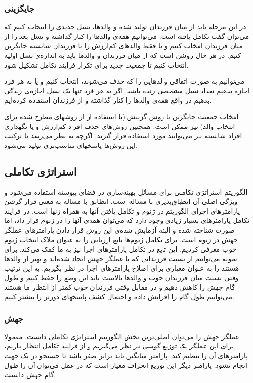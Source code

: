 \documentclass{report}
\begin{document}
\subsubsection{جایگزینی}
در این مرحله باید از میان فرزندان تولید شده و والدها، نسل جدیدی را انتخاب کنیم که می‌توان گفت تکامل یافته است. می‌توانیم همه‌ی والدها را کنار گذاشته و نسل بعد را از میان فرزندان انتخاب کنیم و یا فقط والدهای کم‌ارزش را با فرزندان شایسته جایگزین کنیم. در هر حال روشن است که از میان فرزندان و والدها باید به اندازه‌ی نسل اولیه انتخاب کنیم تا جمعیت جدید برای تکرار فرایند تکامل تشکیل شود.

می‌توانیم به صورت اتفاقی والدهایی را که حذف می‌شوند، انتخاب کنیم و یا به هر فرد اجازه بدهیم تعداد نسل مشخصی زنده باشد؛ اگر به هر فرد تنها یک نسل اجازه‌ی زندگی بدهیم در واقع همه‌ی والدها را کنار گذاشته و از فرزندان استفاده کرده‌ایم.

انتخاب جمعیت جایگزین با روش گزینش (با استفاده از از روشهای مطرح شده برای انتخاب والد) نیز ممکن است. همچنین روش‌های حذف افراد کم‌ارزش و یا نگهداری افراد شایسته نیز می‌توانند مورد استفاده قرار گیرند. اگرچه به نظر می‌رسد با ترکیب این روش‌ها پاسخهای مناسب‌تری تولید می‌شود.

\subsection{استراتژی تکاملی}
الگوریتم استراتژی تکاملی برای مسائل بهینه‌سازی در فضای پیوسته استفاده می‌شود و ویژگی اصلی آن انطباق‌پذیری با مساله است. انطابق با مساله به معنی قرار گرفتن پارامترهای اجرای الگوریتم در ژنوم و تکامل یافتن آنها به همراه ژنها است. در فرایند تکامل پارامترهای بسیار زیادی وجود دارد که می‌توان همه‌ی آنها را در ژنوم قرار داد، اما صورت شناخته شده و البته آزمایش شده‌ی  این روش قرار دادن پارامترهای عملگر جهش در ژنوم است. برای تکامل ژنوم‌ها تابع ارزیابی را به عنوان ملاک انتخاب ژنوم خوب معرفی کردیم، این تابع در تکامل پارامترهای اجرا نیز به ما کمک می‌کند. برای نمونه می‌توانیم از نسبت فرزندانی که با عملگر جهش ایجاد شده‌اند و بهتر از والدها هستند را به عنوان معیاری برای اصلاح پارامترهای اجرا در نظر بگیریم. به این ترتیب وقتی نسبت میان فرزندان خوب و والدها بالاست باید این وضع را حفظ کنیم و طول گام جهش را کاهش دهیم و در مقابل وقتی فرزندان خوب کمتر از انتظار ما هستند می‌توانیم طول گام را افزایش داده و احتمال کشف پاسخهای دورتر را بیشتر کنیم.

\subsubsection{جهش}
عملگر جهش را می‌توان اصلی‌ترین  بخش الگوریتم استراتژی تکاملی دانست. معمولا برای این عملگر یک توزیع گوسی در نظر می‌گیریم و از فرایند تکامل انتظار داریم، پارامترهای آن را تنظیم کند. پارامتر میانگین باید برابر صفر باشد تا جستجو در یک جهت انجام نشود. پارامتر دیگر این توزیع انحراف معیار است که در عمل می‌توان آن را طول گام جهش دانست. 
\end{document}
